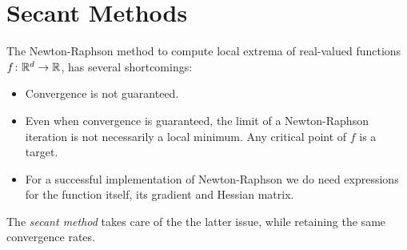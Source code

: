 
\section{Secant Methods}
The Newton-Raphson method to compute local extrema of real-valued functions $f \colon \mathbb{R}^d \to \mathbb{R}$, has several shortcomings: 
\begin{itemize}
	\item Convergence is not guaranteed.
	\item Even when convergence is guaranteed, the limit of a Newton-Raphson iteration is not necessarily a local minimum.  Any critical point of $f$ is a target.
	\item For a successful implementation of Newton-Raphson we do need expressions for the function itself, its gradient and Hessian matrix.  
\end{itemize}
The \emph{secant method} takes care of the the latter issue, while retaining the same convergence rates.

